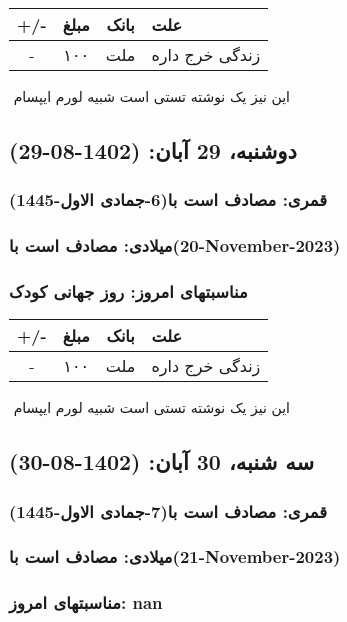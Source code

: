 \documentclass{article}
\newcommand{\rnote}[1]{\marginpar{\textcolor{color}{\StrSubstitute{\##1}{ }{\_}}}}
\newcommand{\myRow}[4]{
    #1 & #2 & #3 & #4 \\ \hline
}
\begin{document}
\begin{tabular}{ | c | c | c | p{5cm} |}
    \hline
    \myRow{ +/- }{مبلغ}{بانک}{علت}
    \myRow{-}{۱۰۰}{ملت}{زندگی خرج داره}
\end{tabular}
\newline
\newline

‌
\rnote{تست}
این نیز یک نوشته تستی است شبیه لورم ایپسام




\newpage
{}
\textcolor{color}{
\section{ دوشنبه، 29 آبان: (1402-08-29) }
\subsubsection*{قمری: مصادف است با(6-جمادی الاول-1445)} 
\subsubsection*{میلادی: مصادف است با(20-November-2023)}
\subsubsection*{مناسبتهای امروز: روز جهانی کودک}
}


\begin{tabular}{ | c | c | c | p{5cm} |}
    \hline
    \myRow{ +/- }{مبلغ}{بانک}{علت}
    \myRow{-}{۱۰۰}{ملت}{زندگی خرج داره}
\end{tabular}
\newline
\newline

‌
\rnote{تست}
این نیز یک نوشته تستی است شبیه لورم ایپسام




\newpage
{}
\textcolor{color}{
\section{ سه شنبه، 30 آبان: (1402-08-30) }
\subsubsection*{قمری: مصادف است با(7-جمادی الاول-1445)} 
\subsubsection*{میلادی: مصادف است با(21-November-2023)}
\subsubsection*{مناسبتهای امروز: nan}
}
\end{document}
